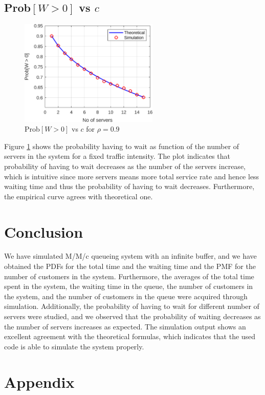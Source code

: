\documentclass[12pt, a4paper]{article}
\begin{document}
\subsection{Prob$[W > 0]$ vs $c$}
\begin{figure}
  \centering 
  \includegraphics[width=250px]{../code/figures/pWaiting_vs_c/no_customers_1000000_max_c_15.png}
  \caption{Prob$[W > 0]$ vs $c$ for $\rho=0.9$}
  \label{W_vs_c}
\end{figure}

Figure \ref{W_vs_c} shows the probability having to wait as function of the number of servers 
in the system for a fixed traffic intensity. The plot indicates that probability of having to 
wait decreases as the number of the servers increase, which is intuitive since more servers means 
more total service rate and hence less waiting time and thus the probability of having to wait decreases. Furthermore, the 
empirical curve agrees with theoretical one.

\section{Conclusion}
We have simulated M/M/c queueing system with an infinite buffer, and we 
have obtained the PDFs for the total time and the waiting time and the PMF 
for the number of customers in the system. Furthermore, the averages of the 
total time spent in the system, the waiting time in the queue, the number 
of customers in the system, and the number of customers in the queue were 
acquired through simulation. Additionally, the probability of having to wait 
for different number of servers were studied, and we observed that the probability
of waiting decreases as the number of servers increases as expected.
The simulation output shows an excellent agreement
with the theoretical formulas, which indicates that the used code is able to 
simulate the system properly. 


\newpage
\section*{Appendix}

\end{document}
